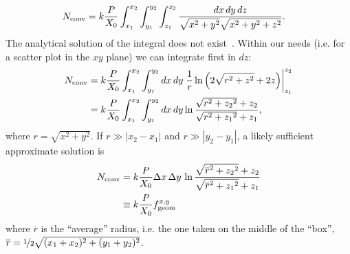 \begin{description}
\begin{equation}
\begin{split}
N_{\rm conv} & = k
\frac{P}{X_0} \int_{x_1}^{x_2} \int_{y_1}^{y_2} \int_{z_1}^{z_2}  \frac{dx\,
  dy \, dz}{\sqrt{x^2+y^2}\sqrt{x^2+y^2+z^2}}. 
\end{split}
\label{eq:14}
\end{equation}
The analytical solution of the integral does not exist~\cite{integrals}. Within
our needs (i.e. for a scatter plot in the $xy$ plane) we can integrate first in $dz$:
\begin{equation}
\begin{split}
N_{\rm conv} & = k
\frac{P}{X_0} \int_{x_1}^{x_2} \int_{y_1}^{y_2} dx \, dy \left. \frac{1}{r} \ln \left( 2\sqrt{r^2+z^2} + 2z \right) \right|_{z_1}^{z_2} \\
& = k \frac{P}{X_0} \int_{x_1}^{x_2} \int_{y_1}^{y_2} dx \, dy  \ln \frac{\sqrt{r^2+{z_2}^2} + z_2}{\sqrt{r^2+{z_1}^2} + z_1} ,
\end{split}
\label{eq:15pre}
\end{equation}
where $r=\sqrt{x^2+y^2}$. If $r\gg |x_2-x_1|$ and $r\gg |y_2
- y_1|$, a likely sufficient approximate
solution is
\begin{equation}
\begin{split}
N_{\rm conv} & = k
\frac{P}{X_0} \Delta x\, \Delta y\,  \ln \frac{\sqrt{\overline{r}^2+{z_2}^2} + z_2}{\sqrt{\overline{r}^2+{z_1}^2} + z_1} \\
& \equiv k \frac{P}{X_0} f^{x, y}_{\rm geom}
\end{split}
\label{eq:15}
\end{equation}
where $\overline{r}$ is the ``average'' radius, i.e. the one taken on
the middle of the ``box'', $\overline{r}=\nicefrac{1}{2}\sqrt{(x_1+x_2)^2+(y_1+y_2)^2}$.
\end{description}

%










  